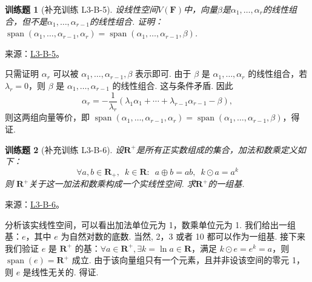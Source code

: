 \documentclass[12pt,fontset=fandol]{ctexart}
\newtheorem{exercise}{训练题}[section]
\begin{document}
\begin{exercise}[补充训练 L3-B-5]\label{prob:L3-B-5}
设线性空间$V(\mathbf{F})$中，向量$\beta$是$\alpha_1,\ldots,\alpha_r$的线性组合，但不是$\alpha_1,\ldots,\alpha_{r-1}$的线性组合. 证明：$\operatorname{span}(\alpha_1,\ldots,\alpha_{r-1},\alpha_r)=\operatorname{span}(\alpha_1,\ldots,\alpha_{r-1},\beta)$.
\end{exercise}
\noindent 来源：\href{https://github.com/yhwu-is/Linear-Algebra-Left-Undone/blob/new/%E8%AE%B2%E4%B9%89/%E4%B8%93%E9%A2%98/3%20%E6%9C%89%E9%99%90%E7%BB%B4%E7%BA%BF%E6%80%A7%E7%A9%BA%E9%97%B4.tex}{L3-B-5}。
\begin{solve}
只需证明 $\alpha_r$ 可以被 $\alpha_1,\ldots,\alpha_{r-1},\beta$ 表示即可. 由于 $\beta$ 是 $\alpha_1,\ldots,\alpha_r$ 的线性组合，若 $\lambda_r=0$，则 $\beta$ 是 $\alpha_1,\ldots,\alpha_{r-1}$ 的线性组合. 这与条件矛盾. 因此 \[\alpha_r=-\dfrac 1{\lambda_r}(\lambda_1\alpha_1+\cdots+\lambda_{r-1}\alpha_{r-1}-\beta),\] 则这两组向量等价，即 $\operatorname{span}(\alpha_1,\ldots,\alpha_{r-1},\alpha_r)=\operatorname{span}(\alpha_1,\ldots,\alpha_{r-1},\beta)$，得证.
\end{solve}

\begin{exercise}[补充训练 L3-B-6]\label{prob:L3-B-6}
\label{item:3:正实数线性空间}
        设$\mathbf{R}^+$是所有正实数组成的集合，加法和数乘定义如下：
        \[ \forall a,b \in \mathbf{R}_+,\enspace k\in \mathbf{R}\colon\enspace a\oplus b = ab,\enspace k\odot a = a^k \]
        则 $\mathbf{R}^+$关于这一加法和数乘构成一个实线性空间. 求$\mathbf{R}^+$的一组基.
\end{exercise}
\noindent 来源：\href{https://github.com/yhwu-is/Linear-Algebra-Left-Undone/blob/new/%E8%AE%B2%E4%B9%89/%E4%B8%93%E9%A2%98/3%20%E6%9C%89%E9%99%90%E7%BB%B4%E7%BA%BF%E6%80%A7%E7%A9%BA%E9%97%B4.tex}{L3-B-6}。
\begin{solve}
分析该实线性空间，可以看出加法单位元为 1，数乘单位元为 1. 我们给出一组基：$e$，其中 $e$ 为自然对数的底数. 当然, 2，3 或者 10 都可以作为一组基. 接下来我们验证 $e$ 是 $\mathbf{R}^+$ 的基：$\forall a\in \mathbf{R}^+,\exists k=\ln a\in\mathbf{R}$，满足 $k\odot e=e^k=a$，则 $\operatorname{span}(e)=\mathbf{R}^+$ 成立. 由于该向量组只有一个元素，且并非设该空间的零元 1，则 $e$ 是线性无关的. 得证.
\end{solve}
\end{document}

